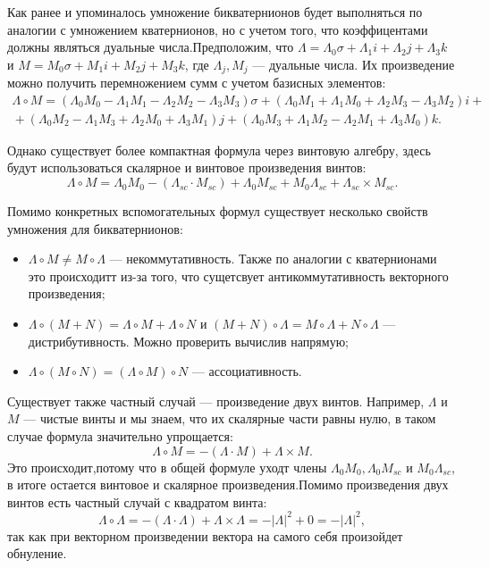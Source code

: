 Как ранее и упоминалось умножение бикватернионов будет выполняться по аналогии с умножением кватернионов, но с учетом того, что коэффицентами должны являться дуальные числа.Предположим, что $\Lambda = \Lambda_0 \sigma + \Lambda_1 i + \Lambda_2 j + \Lambda_3 k$ и $M = M_0 \sigma + M_1 i + M_2 j + M_3 k$, где $\Lambda_j, M_j$ --- дуальные числа.
Их произведение можно получить перемножением сумм с учетом базисных элементов:
\begin{multline*}
    \Lambda \circ M = (\Lambda_0 M_0 - \Lambda_1 M_1 - \Lambda_2 M_2 - \Lambda_3 M_3) \sigma + (\Lambda_0 M_1 + \Lambda_1 M_0 + \Lambda_2 M_3 - \Lambda_3 M_2) i + {}\\ 
    {} + (\Lambda_0 M_2 - \Lambda_1 M_3 + \Lambda_2 M_0 + \Lambda_3 M_1) j + (\Lambda_0 M_3 + \Lambda_1 M_2 - \Lambda_2 M_1 + \Lambda_3 M_0) k.
\end{multline*}

Однако существует более компактная формула через винтовую алгебру, здесь будут использоваться скалярное и винтовое произведения винтов:
\begin{equation*}
    \Lambda \circ M = \Lambda_0 M_0 - (\Lambda_{sc} \cdot M_{sc}) + \Lambda_0 M_{sc} + M_0 \Lambda_{sc} + \Lambda_{sc} \times M_{sc}.
\end{equation*}

Помимо конкретных вспомогательных формул существует несколько свойств умножения для бикватернионов:
\begin{itemize}
    \item $\Lambda \circ M \neq M \circ \Lambda$ --- некоммутативность. Также по аналогии с кватернионами это происходитт из-за того, что сущетсвует антикоммутативность векторного произведения;
    \item $\Lambda \circ (M + N) = \Lambda \circ M + \Lambda \circ N$ и $(M + N) \circ \Lambda = M \circ \Lambda + N \circ \Lambda$ --- дистрибутивность. Можно проверить вычислив напрямую;
    \item $\Lambda \circ (M \circ N) = (\Lambda \circ M) \circ N$ --- ассоциативность. 
\end{itemize}

Существует также частный случай --- произведение двух винтов. Например, $\Lambda$ и $M$ --- чистые винты и мы знаем, что их скалярные части равны нулю, в таком случае формула значительно упрощается:
\begin{equation*}
    \Lambda \circ M = -(\Lambda \cdot M) + \Lambda \times M.
\end{equation*}
Это происходит,потому что в общей формуле уходт члены $\Lambda_0 M_0, \Lambda_0 M_{sc}$ и $M_0 \Lambda_{sc}$, в итоге остается винтовое и скалярное произведения.Помимо произведения двух винтов есть частный случай с квадратом винта:
\begin{equation*}
    \Lambda \circ \Lambda = -(\Lambda \cdot \Lambda) + \Lambda \times \Lambda = -|\Lambda|^2 + 0 = -|\Lambda|^2,
\end{equation*}
так как при векторном произведении вектора на самого себя произойдет обнуление.

